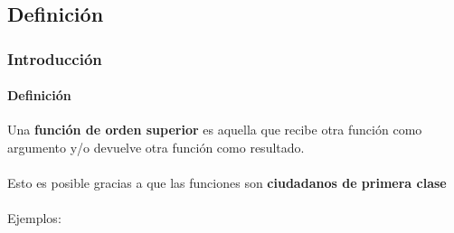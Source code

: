 \subsection{Definición}
\begin{frame}[fragile]
  \frametitle{Introducción} \framesubtitle{Definición} Una
  \textbf{función de orden superior} es aquella que recibe otra
  función como argumento y/o devuelve otra función como resultado.
  \\\\
  Esto es posible gracias a que las funciones son \textbf{ciudadanos
    de primera clase}
  \\\\
  Ejemplos:
  {\color{white}
    \inputminted[bgcolor=bg]{haskell}{code/def00.hs}
  }
\end{frame}